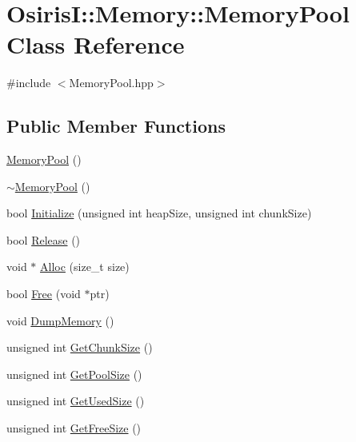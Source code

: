 \hypertarget{class_osiris_i_1_1_memory_1_1_memory_pool}{\section{Osiris\-I\-:\-:Memory\-:\-:Memory\-Pool Class Reference}
\label{class_osiris_i_1_1_memory_1_1_memory_pool}
}


{\ttfamily \#include $<$Memory\-Pool.\-hpp$>$}

\subsection*{Public Member Functions}
\begin{DoxyCompactItemize}
\item 
\hyperlink{class_osiris_i_1_1_memory_1_1_memory_pool_a722ba2966f75be637179f0ff0d9f6e7e}{Memory\-Pool} ()
\item 
\hyperlink{class_osiris_i_1_1_memory_1_1_memory_pool_a52d1a7cf1d6e4d370a14f4e8cee081d9}{$\sim$\-Memory\-Pool} ()
\item 
bool \hyperlink{class_osiris_i_1_1_memory_1_1_memory_pool_ab145911f46972c7932fc253ac0b4a84f}{Initialize} (unsigned int heap\-Size, unsigned int chunk\-Size)
\item 
bool \hyperlink{class_osiris_i_1_1_memory_1_1_memory_pool_a0d58e4a0f219779bde26af4b475f5856}{Release} ()
\item 
void $\ast$ \hyperlink{class_osiris_i_1_1_memory_1_1_memory_pool_aaa8eb18f227cc52f3ec4c6577f7f1923}{Alloc} (size\-\_\-t size)
\item 
bool \hyperlink{class_osiris_i_1_1_memory_1_1_memory_pool_a409c310cc6623f0c4eb3129d0b01a154}{Free} (void $\ast$ptr)
\item 
void \hyperlink{class_osiris_i_1_1_memory_1_1_memory_pool_a82226bec3f3f8ae8daa87dd3849fbd43}{Dump\-Memory} ()
\item 
unsigned int \hyperlink{class_osiris_i_1_1_memory_1_1_memory_pool_a4233647c5d052a0e59bbd8a706d3278c}{Get\-Chunk\-Size} ()
\item 
unsigned int \hyperlink{class_osiris_i_1_1_memory_1_1_memory_pool_a7420efe1a6af46d78feb40247548b2a8}{Get\-Pool\-Size} ()
\item 
unsigned int \hyperlink{class_osiris_i_1_1_memory_1_1_memory_pool_a8104339f9caac4e0079706da1daa7ed4}{Get\-Used\-Size} ()
\item 
unsigned int \hyperlink{class_osiris_i_1_1_memory_1_1_memory_pool_ae29e4789c855b26efebd3b2b133cf5f6}{Get\-Free\-Size} ()
\end{DoxyCompactItemize}



